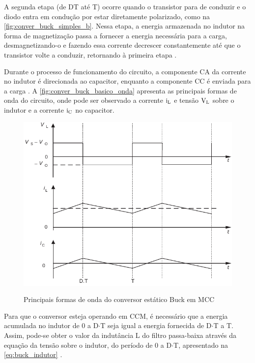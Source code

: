             A segunda etapa (de DT até T) ocorre quando o transistor para de conduzir e o diodo entra em condução por estar diretamente polarizado, como na \autoref{fig:conver_buck_simples_b}. Nessa etapa, a energia armazenada no indutor na forma de magnetização passa a fornecer a energia necessária para a carga, desmagnetizando-o e fazendo essa corrente decrescer constantemente até que o transistor volte a conduzir, retornando à primeira etapa \cite{ref:ELP_livro_Hart}. 
            
            Durante o processo de funcionamento do circuito, a componente CA da corrente no indutor é direcionada ao capacitor, enquanto a componente CC é enviada para a carga \cite{ref:ELP_livro_Hart}. A \autoref{fig:conver_buck_basico_onda} apresenta as principais formas de onda do circuito, onde pode ser observado a corrente $\text{i}_\text{L}$ e tensão $\text{V}_\text{L}$ sobre o indutor e a corrente $\text{i}_\text{C}$ no capacitor. 
            
            \begin{figure}[H]
            	\centering
            	\caption{Principais formas de onda do conversor estático Buck em MCC}
            	\includegraphics[scale=1.1]{pdf/outros/conversor_buck_forma_onda.pdf}
            	\label{fig:conver_buck_basico_onda}
            \end{figure}
            
            Para que o conversor esteja operando em CCM, é necessário que a energia acumulada no indutor de 0 a D$\cdot$T seja igual a energia fornecida de D$\cdot$T a T. Assim, pode-se obter o valor da indutância L do filtro passa-baixa através da equação da tensão sobre o indutor, do período de 0 a D$\cdot$T, apresentado na \autoref{eq:buck_indutor} \cite{ref:ELP_livro_Hart}.
            
